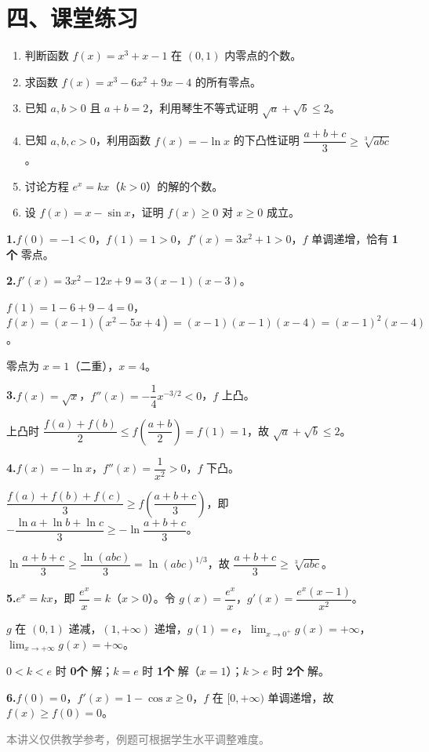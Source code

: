 \documentclass[12pt, a4paper]{ctexart}
\begin{document}
\section*{\textcolor{tipgreen}{四、课堂练习}}

\begin{enumerate}[leftmargin=1.5em]
  \item 判断函数 $f(x)=x^3+x-1$ 在 $(0,1)$ 内零点的个数。
  \item 求函数 $f(x)=x^3-6x^2+9x-4$ 的所有零点。
  \item 已知 $a,b>0$ 且 $a+b=2$，利用琴生不等式证明 $\sqrt{a}+\sqrt{b}\leq 2$。
  \item 已知 $a,b,c>0$，利用函数 $f(x)=-\ln x$ 的下凸性证明 $\dfrac{a+b+c}{3}\geq \sqrt[3]{abc}$。
  \item 讨论方程 $e^x=kx$（$k>0$）的解的个数。
  \item 设 $f(x)=x-\sin x$，证明 $f(x)\geq 0$ 对 $x\geq 0$ 成立。
\end{enumerate}

\vspace{10pt}

\begin{knowledgebox}[参考答案]
\textbf{1.}\quad $f(0)=-1<0$，$f(1)=1>0$，$f'(x)=3x^2+1>0$，$f$ 单调递增，恰有 \textbf{1个} 零点。

\medskip

\textbf{2.}\quad $f'(x)=3x^2-12x+9=3(x-1)(x-3)$。\par
$f(1)=1-6+9-4=0$，$f(x)=(x-1)(x^2-5x+4)=(x-1)(x-1)(x-4)=(x-1)^2(x-4)$。\par
零点为 $x=1$（二重），$x=4$。

\medskip

\textbf{3.}\quad $f(x)=\sqrt{x}$，$f''(x)=-\dfrac{1}{4}x^{-3/2}<0$，$f$ 上凸。\par
上凸时 $\dfrac{f(a)+f(b)}{2}\leq f\!\left(\dfrac{a+b}{2}\right)=f(1)=1$，故 $\sqrt{a}+\sqrt{b}\leq 2$。

\medskip

\textbf{4.}\quad $f(x)=-\ln x$，$f''(x)=\dfrac{1}{x^2}>0$，$f$ 下凸。\par
$\dfrac{f(a)+f(b)+f(c)}{3}\geq f\!\left(\dfrac{a+b+c}{3}\right)$，即 $-\dfrac{\ln a+\ln b+\ln c}{3}\geq -\ln\dfrac{a+b+c}{3}$。\par
$\ln\dfrac{a+b+c}{3}\geq\dfrac{\ln(abc)}{3}=\ln(abc)^{1/3}$，故 $\dfrac{a+b+c}{3}\geq\sqrt[3]{abc}$。

\medskip

\textbf{5.}\quad $e^x=kx$，即 $\dfrac{e^x}{x}=k$（$x>0$）。令 $g(x)=\dfrac{e^x}{x}$，$g'(x)=\dfrac{e^x(x-1)}{x^2}$。\par
$g$ 在 $(0,1)$ 递减，$(1,+\infty)$ 递增，$g(1)=e$，$\lim_{x\to 0^+}g(x)=+\infty$，$\lim_{x\to+\infty}g(x)=+\infty$。\par
$0<k<e$ 时 \textbf{0个} 解；$k=e$ 时 \textbf{1个} 解（$x=1$）；$k>e$ 时 \textbf{2个} 解。

\medskip

\textbf{6.}\quad $f(0)=0$，$f'(x)=1-\cos x\geq 0$，$f$ 在 $[0,+\infty)$ 单调递增，故 $f(x)\geq f(0)=0$。
\end{knowledgebox}

\vfill
\begin{center}
\small\textcolor{gray}{本讲义仅供教学参考，例题可根据学生水平调整难度。}
\end{center}
\end{document}
